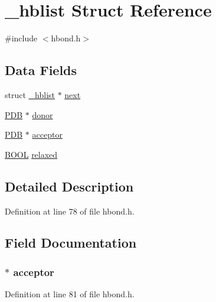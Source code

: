 \hypertarget{struct__hblist}{\section{\-\_\-hblist Struct Reference}
\label{struct__hblist}
}


{\ttfamily \#include $<$hbond.\-h$>$}

\subsection*{Data Fields}
\begin{DoxyCompactItemize}
\item 
struct \hyperlink{struct__hblist}{\-\_\-hblist} $\ast$ \hyperlink{struct__hblist_a5fbc92c76707b2e557684747d57f182c}{next}
\item 
\hyperlink{pdb_8h_aa31eb9fe57a50b29778e64bb131b22bf}{P\-D\-B} $\ast$ \hyperlink{struct__hblist_a4dba8777f299b21706d939ca2536b49e}{donor}
\item 
\hyperlink{pdb_8h_aa31eb9fe57a50b29778e64bb131b22bf}{P\-D\-B} $\ast$ \hyperlink{struct__hblist_a54c52c55a69c23da6d53d96f6e9ce2c7}{acceptor}
\item 
\hyperlink{_sys_defs_8h_a2df9d82ef74025dde989a5ae3edc886c}{B\-O\-O\-L} \hyperlink{struct__hblist_ac28045b9df01d624f6333f21453287ae}{relaxed}
\end{DoxyCompactItemize}


\subsection{Detailed Description}


Definition at line 78 of file hbond.\-h.



\subsection{Field Documentation}
\hypertarget{struct__hblist_a54c52c55a69c23da6d53d96f6e9ce2c7}{
\subsubsection[{acceptor}]{ $\ast$ acceptor}}\label{struct__hblist_a54c52c55a69c23da6d53d96f6e9ce2c7}


Definition at line 81 of file hbond.\-h.

